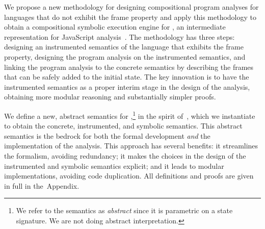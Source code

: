 
We propose a new methodology for designing compositional program analyses for languages that do not exhibit the frame property and apply this methodology to obtain a compositional symbolic execution engine for \jsil, an intermediate representation for JavaScript analysis~\cite{javert}. 
%
%
The methodology has three steps:  designing an instrumented semantics of the language that exhibits the frame property,  designing the program  analysis on the instrumented semantics, and  linking the program analysis to the concrete semantics by describing the frames that can be safely added to the initial state.   
%
The key innovation is to have the instrumented semantics as a proper interim stage in the design of the analysis, obtaining 
more modular reasoning and substantially simpler proofs.

We define a new, abstract semantics for \jsil,\footnote{We refer to the semantics as \emph{abstract} since it 
is parametric on a \jsil state signature. We are not doing abstract interpretation.} in the spirit %
 of~\cite{vanhorn:icfp:2010}, which we instantiate to obtain the concrete, instrumented, and symbolic semantics. 
This abstract semantics is the bedrock for both the formal development \emph{and} the implementation of the analysis. This approach has several benefits: it streamlines the formalism, avoiding redundancy; it makes the choices in the design of the instrumented and symbolic semantics explicit; and it leads to modular implementations, avoiding code duplication.
%
All definitions and proofs are given in full in the~Appendix.


